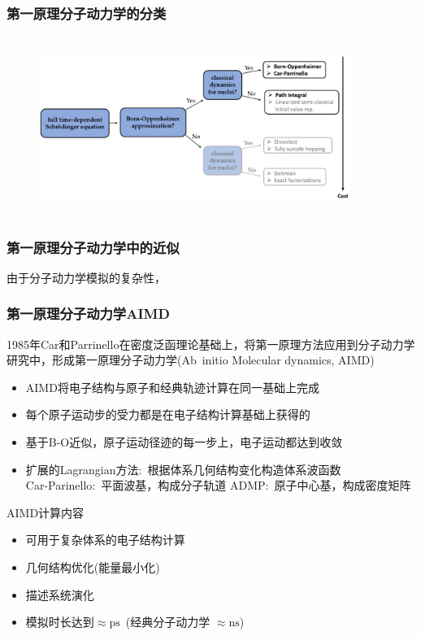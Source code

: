 \frame
{
	\frametitle{第一原理分子动力学的分类}
\begin{figure}[h!]
\centering
\vspace*{-0.05in}
\includegraphics[height=2.3in,width=4.0in,viewport=0 0 440 230,clip]{Figures/Molecular-dynamics_Claaified.png}
\caption{\fontsize{5.2pt}{4.2pt}}%
\label{Molecular-dynamics_Claaified}
\end{figure}
}

\frame
{
	\frametitle{第一原理分子动力学中的近似}
	由于分子动力学模拟的复杂性，
}

\frame
{
	\frametitle{第一原理分子动力学\textrm{AIMD}}
	1985年\textrm{Car}和\textrm{Parrinello}在密度泛函理论基础上，将第一原理方法应用到分子动力学研究中，形成第一原理分子动力学\textrm{(Ab~initio Molecular dynamics, AIMD)}
	\begin{itemize}
		\item \textrm{AIMD}将电子结构与原子和经典轨迹计算在同一基础上完成
		\item 每个原子运动步的受力都是在电子结构计算基础上获得的
		\item 基于\textrm{B-O}近似，原子运动径迹的每一步上，电子运动都达到收敛
		\item 扩展的\textrm{Lagrangian}方法:~根据体系几何结构变化构造体系波函数\\
			\textrm{Car-Parinello}:~平面波基，构成分子轨道
			\textrm{ADMP}:~原子中心基，构成密度矩阵
	\end{itemize}
	\textrm{AIMD}计算内容
	\begin{itemize}
		\item 可用于复杂体系的电子结构计算
		\item 几何结构优化(能量最小化)
		\item 描述系统演化
		\item 模拟时长达到$\approx{\mathrm{ps}}$~(经典分子动力学 $\approx\mathrm{ns}$)
	\end{itemize}

}


